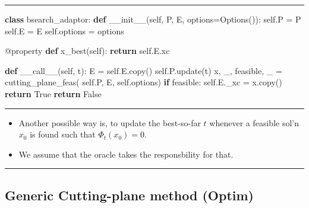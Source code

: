 \documentclass[]{article}
\newenvironment{Shaded}{}{}
\newcommand{\AttributeTok}[1]{\textcolor[rgb]{0.49,0.56,0.16}{#1}}
\newcommand{\ControlFlowTok}[1]{\textcolor[rgb]{0.00,0.44,0.13}{\textbf{#1}}}
\newcommand{\FunctionTok}[1]{\textcolor[rgb]{0.02,0.16,0.49}{#1}}
\newcommand{\KeywordTok}[1]{\textcolor[rgb]{0.00,0.44,0.13}{\textbf{#1}}}
\newcommand{\NormalTok}[1]{#1}
\newcommand{\OperatorTok}[1]{\textcolor[rgb]{0.40,0.40,0.40}{#1}}
\newcommand{\VariableTok}[1]{\textcolor[rgb]{0.10,0.09,0.49}{#1}}
\providecommand{\tightlist}{%
  \setlength{\itemsep}{0pt}\setlength{\parskip}{0pt}}
\begin{document}
\begin{center}\rule{0.5\linewidth}{\linethickness}\end{center}

\begin{Shaded}
\begin{Highlighting}[]
\KeywordTok{class}\NormalTok{ bsearch_adaptor:}
    \KeywordTok{def} \FunctionTok{__init__}\NormalTok{(}\VariableTok{self}\NormalTok{, P, E, options}\OperatorTok{=}\NormalTok{Options()):}
        \VariableTok{self}\NormalTok{.P }\OperatorTok{=}\NormalTok{ P}
        \VariableTok{self}\NormalTok{.E }\OperatorTok{=}\NormalTok{ E}
        \VariableTok{self}\NormalTok{.options }\OperatorTok{=}\NormalTok{ options}

    \AttributeTok{@property}
    \KeywordTok{def}\NormalTok{ x_best(}\VariableTok{self}\NormalTok{):}
        \ControlFlowTok{return} \VariableTok{self}\NormalTok{.E.xc}

    \KeywordTok{def} \FunctionTok{__call__}\NormalTok{(}\VariableTok{self}\NormalTok{, t):}
\NormalTok{        E }\OperatorTok{=} \VariableTok{self}\NormalTok{.E.copy()}
        \VariableTok{self}\NormalTok{.P.update(t)}
\NormalTok{        x, _, feasible, _ }\OperatorTok{=}\NormalTok{ cutting_plane_feas(}
            \VariableTok{self}\NormalTok{.P, E, }\VariableTok{self}\NormalTok{.options)}
        \ControlFlowTok{if}\NormalTok{ feasible:}
            \VariableTok{self}\NormalTok{.E._xc }\OperatorTok{=}\NormalTok{ x.copy()}
            \ControlFlowTok{return} \VariableTok{True}
        \ControlFlowTok{return} \VariableTok{False}
\end{Highlighting}
\end{Shaded}

\begin{center}\rule{0.5\linewidth}{\linethickness}\end{center}

\begin{itemize}
\tightlist
\item
  Another possible way is, to update the best-so-far \(t\) whenever a
  feasible sol'n \(x_0\) is found such that \(\Phi_t(x_0) = 0\).
\item
  We assume that the oracle takes the responsbility for that.
\end{itemize}

\begin{center}\rule{0.5\linewidth}{\linethickness}\end{center}

\hypertarget{generic-cutting-plane-method-optim}{%
\subsection{Generic Cutting-plane method
(Optim)}\label{generic-cutting-plane-method-optim}}
\end{document}
